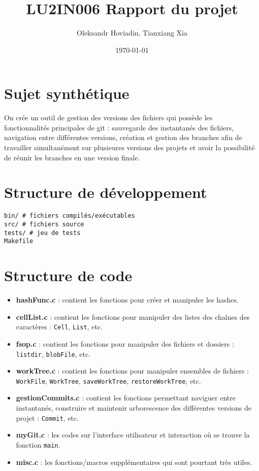 \documentclass{report}
\title{LU2IN006 Rapport du projet}
\author{Oleksandr Hoviadin, Tianxiang Xia}
\date{\today}
\begin{document}
\maketitle
\section*{Sujet synthétique}
On crée un outil de gestion des versions des fichiers
qui possède les fonctionnalités principales de git : sauvegarde des instantanés
des fichiers, navigation entre différentes versions,
création et gestion des branches afin de travailler simultanément
sur plusieures versions des projets et avoir la possibilité de réunir les branches en une version finale.

\section*{Structure de développement}

\begin{verbatim}
bin/ # fichiers compilés/exécutables
src/ # fichiers source
tests/ # jeu de tests
Makefile
\end{verbatim}

\section*{Structure de code}
\begin{itemize}
    \item \textbf{hashFunc.c} : contient les fonctions pour créer et manipuler les hashes.
    \item \textbf{cellList.c} : contient les fonctions pour manipuler des listes des chaînes des caractères : \verb|Cell|, \verb|List|, etc.
    \item \textbf{fsop.c} : contient les fonctions pour manipuler des fichiers et dossiers : \verb|listdir|, \verb|blobFile|, etc.
    \item \textbf{workTree.c} : contient les fonctions pour manipuler ensembles de fichiers : \verb|WorkFile|, \verb|WorkTree|, \verb|saveWorkTree|, \verb|restoreWorkTree|, etc.
    \item \textbf{gestionCommits.c} : contient les fonctions permettant naviguer entre instantanés, construire et maintenir arborescence des différentes versions de projet : \verb|Commit|, etc.
    \item\textbf{myGit.c} : les codes sur l'interface utilisateur et interaction où se trouve la fonction \verb|main|.
    \item\textbf{misc.c} : les fonctions/macros supplémentaires qui sont pourtant très utiles.
\end{itemize}
\end{document}
